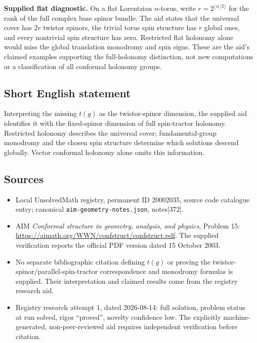 \documentclass[11pt]{article}
\begin{document}
\textbf{Supplied flat diagnostic.} On a flat Lorentzian $n$-torus, write $r=2^{\lfloor n/2\rfloor}$ for the rank of the full complex base spinor bundle. The aid states that the universal cover has $2r$ twistor spinors, the trivial torus spin structure has $r$ global ones, and every nontrivial spin structure has zero. Restricted flat holonomy alone would miss the global translation monodromy and spin signs. These are the aid's claimed examples supporting the full-holonomy distinction, not new computations or a classification of all conformal holonomy groups.
\subsection{Short English statement}
Interpreting the missing $t(g)$ as the twistor-spinor dimension, the supplied aid identifies it with the fixed-spinor dimension of full spin-tractor holonomy. Restricted holonomy describes the universal cover; fundamental-group monodromy and the chosen spin structure determine which solutions descend globally. Vector conformal holonomy alone omits this information.
\subsection{Sources}
\begin{itemize}
\item Local UnsolvedMath registry, permanent ID 20002035, source code catalogue entry; canonical \texttt{aim-geometry-notes.json}, notes[372].
\item AIM \emph{Conformal structure in geometry, analysis, and physics}, Problem 15: \url{https://aimath.org/WWN/confstruct/confstruct.pdf}. The supplied verification reports the official PDF version dated 15 October 2003.
\item No separate bibliographic citation defining $t(g)$ or proving the twistor-spinor/parallel-spin-tractor correspondence and monodromy formulas is supplied. Their interpretation and claimed results come from the registry research aid.
\item Registry research attempt 1, dated 2026-08-14: full solution, problem status at run solved, rigor ``proved'', novelty confidence low. The explicitly machine-generated, non-peer-reviewed aid requires independent verification before citation.
\end{itemize}
\end{document}
